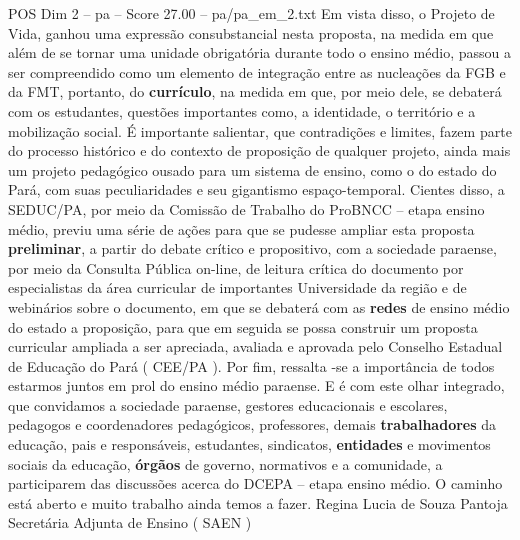 \begin{textsample}{POS Dim 2 – pa – Score 27.00 – pa/pa\_em\_2.txt}
Em vista disso, o Projeto de Vida, ganhou uma expressão consubstancial nesta proposta, na medida em que além de se tornar uma unidade obrigatória durante todo o ensino médio, passou a ser compreendido como um elemento de integração entre as nucleações da FGB e da FMT, portanto, do \textbf{currículo}, na medida em que, por meio dele, se debaterá com os estudantes, questões importantes como, a identidade, o território e a mobilização social.
É importante salientar, que contradições e limites, fazem parte do processo histórico e do contexto de proposição de qualquer projeto, ainda mais um projeto pedagógico ousado para um sistema de ensino, como o do estado do Pará, com suas peculiaridades e seu gigantismo espaço-temporal.
Cientes disso, a SEDUC/PA, por meio da Comissão de Trabalho do ProBNCC – etapa ensino médio, previu uma série de ações para que se pudesse ampliar esta proposta \textbf{preliminar}, a partir do debate crítico e propositivo, com a sociedade paraense, por meio da Consulta Pública on-line, de leitura crítica do documento por especialistas da área curricular de importantes Universidade da região e de webinários sobre o documento, em que se debaterá com as \textbf{redes} de ensino médio do estado a proposição, para que em seguida se possa construir um proposta curricular ampliada a ser apreciada, avaliada e aprovada pelo Conselho Estadual de Educação do Pará ( CEE/PA ).
Por fim, ressalta -se a importância de todos estarmos juntos em prol do ensino médio paraense.
E é com este olhar integrado, que convidamos a sociedade paraense, gestores educacionais e escolares, pedagogos e coordenadores pedagógicos, professores, demais \textbf{trabalhadores} da educação, pais e responsáveis, estudantes, sindicatos, \textbf{entidades} e movimentos sociais da educação, \textbf{órgãos} de governo, normativos e a comunidade, a participarem das discussões acerca do DCEPA – etapa ensino médio.
O caminho está aberto e muito trabalho ainda temos a fazer.
Regina Lucia de Souza Pantoja Secretária Adjunta de Ensino ( SAEN )

\end{textsample}
